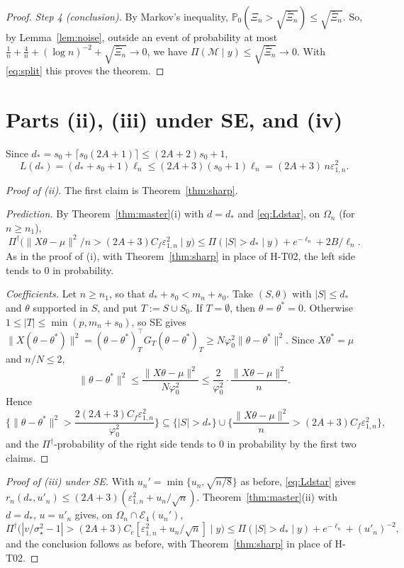 \documentclass[11pt]{article}
\theoremstyle{remark}
\renewcommand{\P}{\mathbb P}
\newcommand{\Pd}{\Pi^\dagger}
\newcommand{\ve}{\varepsilon}
\newcommand{\sst}{\sigma_\star}
\begin{document}
\begin{proof}
\emph{Step 4 (conclusion).} By Markov's inequality, $\P_0(\Xi_n>\sqrt{\bar\Xi_n})\le\sqrt{\bar\Xi_n}$. So, by Lemma~\ref{lem:noise}, outside an event of probability at most $\frac1n+\frac4n+(\log n)^{-2}+\sqrt{\bar\Xi_n}\to0$, we have $\Pi(\mathcal M\mid y)\le\sqrt{\bar\Xi_n}\to0$. With \eqref{eq:split} this proves the theorem.
\end{proof}

\section{Parts (ii), (iii) under SE, and (iv)}\label{sec:SE}

Since $d_\ast=s_0+\lceil s_0(2A+1)\rceil\le(2A+2)s_0+1$,
\begin{equation}\label{eq:Ldstar}
L(d_\ast)=(d_\ast+s_0+1)\ell_n\le(2A+3)(s_0+1)\ell_n=(2A+3)\,n\ve_{1,n}^2 .
\end{equation}

\begin{proof}[Proof of (ii)]
The first claim is Theorem~\ref{thm:sharp}.

\emph{Prediction.} By Theorem~\ref{thm:master}(i) with $d=d_\ast$ and \eqref{eq:Ldstar}, on $\Omega_n$ (for $n\ge n_1$),
\[
\Pd\big(\|X\theta-\mu\|^2/n>(2A+3)C_f\ve_{1,n}^2\mid y\big)\le\Pi(|S|>d_\ast\mid y)+e^{-\ell_n}+2B/\ell_n .
\]
As in the proof of (i), with Theorem~\ref{thm:sharp} in place of H-T02, the left side tends to $0$ in probability.

\emph{Coefficients.} Let $n\ge n_1$, so that $d_\ast+s_0<m_n+s_0$. Take $(S,\theta)$ with $|S|\le d_\ast$ and $\theta$ supported in $S$, and put $T:=S\cup S_0$. If $T=\emptyset$, then $\theta=\theta^\ast=0$. Otherwise $1\le|T|\le\min(p,m_n+s_0)$, so SE gives $\|X(\theta-\theta^\ast)\|^2=(\theta-\theta^\ast)_T^\top G_T(\theta-\theta^\ast)_T\ge N\varphi_0^2\|\theta-\theta^\ast\|^2$. Since $X\theta^\ast=\mu$ and $n/N\le2$,
\[
\|\theta-\theta^\ast\|^2\le\frac{\|X\theta-\mu\|^2}{N\varphi_0^2}\le\frac{2}{\varphi_0^2}\cdot\frac{\|X\theta-\mu\|^2}{n}.
\]
Hence
\[
\Big\{\|\theta-\theta^\ast\|^2>\frac{2(2A+3)C_f\ve_{1,n}^2}{\varphi_0^2}\Big\}\subseteq\{|S|>d_\ast\}\cup\Big\{\frac{\|X\theta-\mu\|^2}{n}>(2A+3)C_f\ve_{1,n}^2\Big\},
\]
and the $\Pd$-probability of the right side tends to $0$ in probability by the first two claims.
\end{proof}

\begin{proof}[Proof of (iii) under SE]
With $u_n'=\min\{u_n,\sqrt{n/8}\}$ as before, \eqref{eq:Ldstar} gives $r_n(d_\ast,u'_n)\le(2A+3)(\ve_{1,n}^2+u_n/\sqrt n)$. Theorem~\ref{thm:master}(ii) with $d=d_\ast$, $u=u'_n$ gives, on $\Omega_n\cap\mathcal E_4(u_n')$,
\[
\Pd\big(|v/\sst^2-1|>(2A+3)C_e[\ve_{1,n}^2+u_n/\sqrt n]\mid y\big)\le\Pi(|S|>d_\ast\mid y)+e^{-\ell_n}+(u'_n)^{-2},
\]
and the conclusion follows as before, with Theorem~\ref{thm:sharp} in place of H-T02.
\end{proof}
\end{document}
